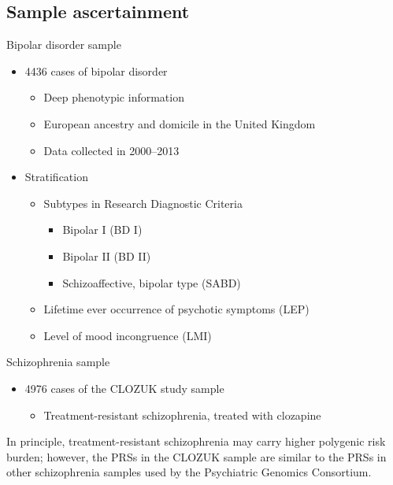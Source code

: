\documentclass{beamer}
\begin{document}
\subsection{Sample ascertainment}
\begin{frame}{Bipolar disorder sample}
    \begin{itemize}
        \item 4436 cases of bipolar disorder
            \begin{itemize}
                \item Deep phenotypic information
                \item European ancestry and domicile in the United Kingdom
                \item Data collected in 2000--2013
            \end{itemize}
        \item Stratification
            \begin{itemize}
                \item Subtypes in Research Diagnostic Criteria
                    \begin{itemize}
                        \item Bipolar I (BD I)
                        \item Bipolar II (BD II)
                        \item Schizoaffective, bipolar type (SABD)
                    \end{itemize}
                \item Lifetime ever occurrence of psychotic symptoms (LEP)
                \item Level of mood incongruence (LMI)
            \end{itemize}
    \end{itemize}
\end{frame}

\begin{frame}{Schizophrenia sample}
    \begin{itemize}
        \item 4976 cases of the CLOZUK study sample
            \begin{itemize}
                \item Treatment-resistant schizophrenia, treated with clozapine
            \end{itemize}
    \end{itemize}

    In principle, treatment-resistant schizophrenia may carry higher polygenic
    risk burden; however, the PRSs in the CLOZUK sample are similar to the PRSs
    in other schizophrenia samples used by the Psychiatric Genomics Consortium.
\end{frame}
\end{document}

